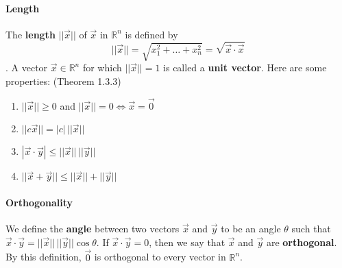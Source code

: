 \documentclass[10pt,letter]{article}
\begin{document}
\paragraph{Length} The \textbf{length} $||\vec{x}||$ of $\vec{x}$ in $\mathbb{R}^n$ is defined by $$||\vec{x}||=\sqrt{x_1^2+\ldots+x_n^2}=\sqrt{\vec{x}\cdot\vec{x}}$$. A vector $\vec{x}\in\mathbb{R}^n$ for which $||\vec{x}||=1$ is called a \textbf{unit vector}. Here are some properties: (Theorem 1.3.3) \begin{enumerate}
    \item $||\vec{x}||\geq0$ and $||\vec{x}||=0\Leftrightarrow \vec{x}=\vec{0}$ 
    \item $||c\vec{x}||=|c|\,||\vec{x}||$ 
    \item $|\vec{x}\cdot\vec{y}| \leq ||\vec{x}||\,||\vec{y}||$ 
    \item $||\vec{x}+\vec{y}||\leq||\vec{x}||+||\vec{y}||$ 
\end{enumerate}

\paragraph{Orthogonality} We define the \textbf{angle} between two vectors $\vec{x}$ and $\vec{y}$ to be an angle $\theta$ such that $\vec{x}\cdot\vec{y}=||\vec{x}||\,||\vec{y}||\cos\theta$. If $\vec{x}\cdot\vec{y}=0$, then we say that $\vec{x}$ and $\vec{y}$ are \textbf{orthogonal}. By this definition, $\vec{0}$ is orthogonal to every vector in $\mathbb{R}^n$.  
\end{document}
